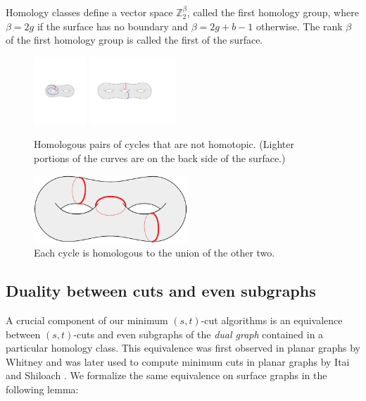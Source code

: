 \documentclass[letterpaper,review]{siamart190516}
\def\Z{\mathbb{Z}}
\begin{document}
Homology classes define a vector space $\Z_2^\beta$, called the first homology group, where $\beta = 2g$ if the surface has no boundary and $\beta = 2g+b-1$ otherwise.
The rank $\beta$ of the first homology group is called the first  of the surface.

\begin{figure}[htb]
\centering
\includegraphics[height=1in]{Fig/homologous3}\qquad
\includegraphics[height=1in]{Fig/homologous2}
\caption{Homologous pairs of cycles that are not homotopic.  (Lighter portions of the curves are on the back side of the surface.)}
\label{fig:homology}
\end{figure}

\begin{figure}[htb]
\centering
\includegraphics[height=1in]{Fig/homologous1}
\caption{Each cycle is homologous to the union of the other two.}
\label{fig:homology2}
\end{figure}


\subsection{Duality between cuts and even subgraphs}
\label{SS:duality}


A crucial component of our minimum $(s,t)$-cut algorithms is an equivalence between $(s,t)$-cuts and even subgraphs of the \emph{dual graph} contained in a particular homology class.  This equivalence was first observed in planar graphs by Whitney \cite{w-pg-33} and was later used to compute minimum cuts in planar graphs by Itai and Shiloach \cite{is-mfpn-79}.
We formalize the same equivalence on surface graphs in the following lemma:
\end{document}
